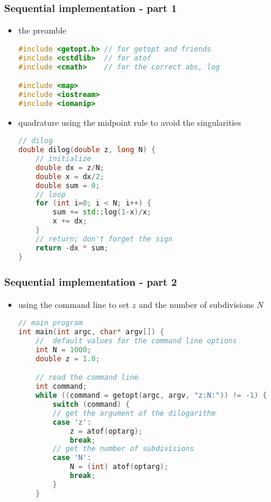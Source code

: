 %
%
%
%


\begin{frame}[fragile]
%
  \frametitle{Sequential implementation - part 1}
%
  \begin{itemize}
  \item the preamble
  \begin{lstlisting}[language=c++,name=sequential]
#include <getopt.h> // for getopt and friends
#include <cstdlib>  // for atof
#include <cmath>    // for the correct abs, log

#include <map>
#include <iostream>
#include <iomanip>
  \end{lstlisting}
%
  \item quadrature using the midpoint rule to avoid the singularities
  \begin{lstlisting}[language=c++,name=sequential]
// dilog
double dilog(double z, long N) {
    // initialize
    double dx = z/N;
    double x = dx/2;
    double sum = 0;
    // loop
    for (int i=0; i < N; i++) {
        sum += std::log(1-x)/x;
        x += dx;
    }
    // return; don't forget the sign
    return -dx * sum;
}

  \end{lstlisting}
%
  \end{itemize}
%
\end{frame}

\begin{frame}[fragile]
%
  \frametitle{Sequential implementation - part 2}
%
  \begin{itemize}
  \item using the command line to set $z$ and the number of subdivisions $N$
  \begin{lstlisting}[language=c++,name=sequential]
// main program
int main(int argc, char* argv[]) {
    //  default values for the command line options
    int N = 1000;
    double z = 1.0;

    // read the command line
    int command;
    while ((command = getopt(argc, argv, "z:N:")) != -1) {
        switch (command) {
        // get the argument of the dilogarithm 
        case 'z':
            z = atof(optarg);
            break;
        // get the number of subdivisions
        case 'N':
            N = (int) atof(optarg);
            break;
        }
    }
  \end{lstlisting}
%
  \end{itemize}
%
\end{frame}

